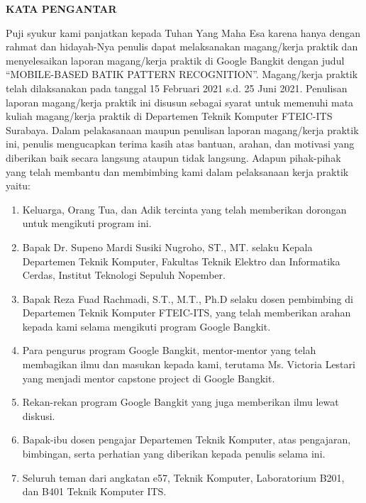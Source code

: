 \begin{center}
  \Large\textbf{KATA PENGANTAR}
\end{center}
\vspace{2ex}


Puji syukur kami panjatkan kepada Tuhan Yang Maha Esa karena hanya dengan rahmat dan hidayah-Nya penulis dapat melaksanakan magang/kerja praktik dan menyelesaikan laporan magang/kerja praktik di Google Bangkit dengan judul “MOBILE-BASED BATIK PATTERN RECOGNITION”.
Magang/kerja praktik telah dilaksanakan pada tanggal 15 Februari 2021 s.d. 25 Juni 2021.
Penulisan laporan magang/kerja praktik ini disusun sebagai syarat untuk memenuhi mata kuliah magang/kerja praktik di Departemen Teknik Komputer FTEIC-ITS Surabaya.
Dalam pelakasanaan maupun penulisan laporan magang/kerja praktik ini, penulis mengucapkan terima kasih atas bantuan, arahan, dan motivasi yang diberikan baik secara langsung ataupun tidak langsung.
Adapun pihak-pihak yang telah membantu dan membimbing kami dalam pelaksanaan kerja praktik yaitu:

\begin{enumerate}[nolistsep]

  \item Keluarga, Orang Tua, dan Adik tercinta yang telah memberikan dorongan untuk mengikuti program ini.

  \item Bapak Dr. Supeno Mardi Susiki Nugroho, ST., MT. selaku Kepala Departemen Teknik Komputer, Fakultas Teknik Elektro dan Informatika Cerdas, Institut Teknologi Sepuluh Nopember.

  \item Bapak Reza Fuad Rachmadi, S.T., M.T., Ph.D selaku dosen pembimbing di Departemen Teknik Komputer FTEIC-ITS, yang telah memberikan arahan kepada kami selama mengikuti program Google Bangkit.

  \item Para pengurus program Google Bangkit, mentor-mentor yang telah membagikan ilmu dan masukan kepada kami, terutama Ms. Victoria Lestari yang menjadi mentor capstone project di Google Bangkit.

  \item Rekan-rekan program Google Bangkit yang juga memberikan ilmu lewat diskusi.

  \item Bapak-ibu dosen pengajar Departemen Teknik Komputer, atas pengajaran, bimbingan, serta perhatian yang diberikan kepada penulis selama ini.

  \item Seluruh teman dari angkatan e57, Teknik Komputer, Laboratorium B201, dan B401 Teknik Komputer ITS.

\end{enumerate}

